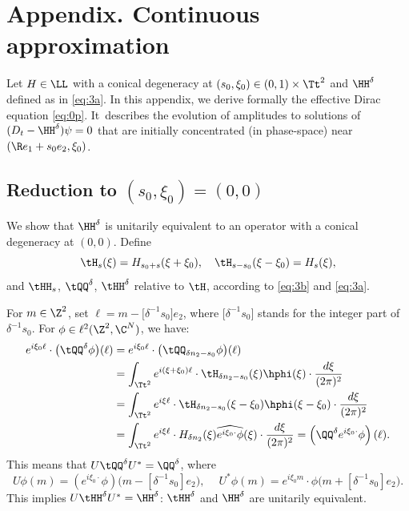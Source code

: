 \appendix
{}
\section*{Appendix. Continuous approximation}
Let $H \in \LL$ with a conical degeneracy at $(s_0, \xi_0) \in (0,1) \times \Tt^2$ and $\HH^\delta$ defined as in \eqref{eq:3a}. In this appendix, we derive formally the effective Dirac equation \eqref{eq:0p}. It~describes the evolution of amplitudes to solutions of $(D_t-\HH^\delta) \psi = 0$ that are initially concentrated (in phase-space) near $(\R e_1+s_0e_2,\xi_0)$.

\subsection{Reduction to $(s_0, \xi_0) = (0,0)$}\label{sec:6.1} We show that $\HH^\delta$ is unitarily equivalent to an operator with a conical degeneracy at $(0,0)$. Define
\begin{equation}\label{eq:3f}
\tH_s(\xi) = H_{s_0+s}(\xi+\xi_0), \quad \tH_{s-s_0}(\xi-\xi_0) = H_s(\xi),
\end{equation}
and $\tHH_s$, $\tQQ^\delta$, $\tHH^\delta$ relative to $\tH$, according to \eqref{eq:3b} and \eqref{eq:3a}.

For $m \in \Z^2$, set $\ell = m - \bigl[\delta^{-1} s_0\bigr] e_2$, where $\bigl[\delta^{-1} s_0\bigr]$ stands for the integer part of $\delta^{-1} s_0$.
For $\phi \in \ell^2(\Z^2,\C^N)$, we have:
\[
\begin{split}
e^{i\xi_0 \ell } \cdot \bigl( \tQQ^\delta \phi \bigr)(\ell)
&= e^{i\xi_0 \ell } \cdot \bigl( \tQQ_{\delta n_2-s_0} \phi \bigr)(\ell)
\\
&= \int_{\Tt^2} e^{i(\xi+\xi_0) \ell} \cdot \tH_{\delta n_2-s_0}(\xi) \hphi(\xi) \cdot \dfrac{d\xi}{(2\pi)^2}\\
&= \int_{\Tt^2} e^{i\xi \ell} \cdot \tH_{\delta n_2-s_0}(\xi-\xi_0) \hphi(\xi-\xi_0) \cdot \dfrac{d\xi}{(2\pi)^2}
\\
&= \int_{\Tt^2} e^{i\xi \ell} \cdot H_{\delta n_2}(\xi) \widehat{e^{i\xi_0 \cdot}\phi}(\xi) \cdot \dfrac{d\xi}{(2\pi)^2} = \left(\QQ^\delta e^{i\xi_0 \cdot} \phi\right) (\ell).
\end{split}
\]
This means that $U \tQQ^\delta U^* = \QQ^\delta$, where
\begin{equation*}
U \phi(m) = \left(e^{i\xi_0 \cdot} \phi\right)\bigl( m - [\delta^{-1}s_0] e_2\bigr), \quad \ U^* \phi(m) = e^{i\xi_0 m} \cdot \phi\bigl( m + [\delta^{-1}s_0] e_2 \bigr).
\end{equation*}
This implies $U \tHH^\delta U^* = \HH^\delta$: $\tHH^\delta$ and $\HH^\delta$ are unitarily equivalent.

